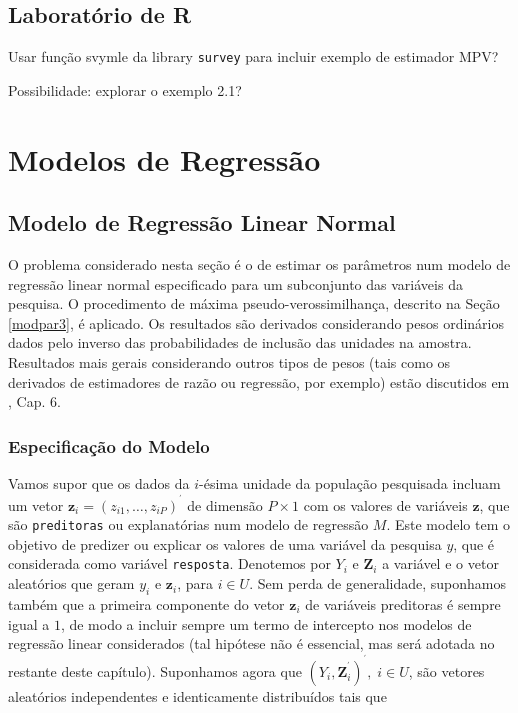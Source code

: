\documentclass[]{book}
\theoremstyle{definition}
\theoremstyle{definition}
\theoremstyle{definition}
\theoremstyle{remark}
\begin{document}
\section{Laboratório de R}\label{laboratorio-de-r-2}

Usar função svymle da library \texttt{survey} \citep{R-survey} para
incluir exemplo de estimador MPV?

Possibilidade: explorar o exemplo 2.1?

\chapter{Modelos de Regressão}\label{modreg}

\section{Modelo de Regressão Linear Normal}\label{modlinear}

O problema considerado nesta seção é o de estimar os parâmetros num
modelo de regressão linear normal especificado para um subconjunto das
variáveis da pesquisa. O procedimento de máxima pseudo-verossimilhança,
descrito na Seção \ref{modpar3}, é aplicado. Os resultados são derivados
considerando pesos ordinários dados pelo inverso das probabilidades de
inclusão das unidades na amostra. Resultados mais gerais considerando
outros tipos de pesos (tais como os derivados de estimadores de razão ou
regressão, por exemplo) estão discutidos em \citep{Silva}, Cap. 6.

\subsection{Especificação do Modelo}\label{especificacao-do-modelo}

Vamos supor que os dados da \(i\)-ésima unidade da população pesquisada
incluam um vetor
\(\mathbf{z}_{i}=\left( z_{i1},\ldots ,z_{iP}\right) ^{^{\prime }}\) de
dimensão \(P\times 1\) com os valores de variáveis \(\mathbf{z}\), que
são \texttt{preditoras} ou explanatórias num modelo de regressão \(M\).
Este modelo tem o objetivo de predizer ou explicar os valores de uma
variável da pesquisa \(y\), que é considerada como variável
\texttt{resposta}. Denotemos por \(Y_{i}\) e \(\mathbf{Z}_{i}\) a
variável e o vetor aleatórios que geram \(y_{i}\) e \(\mathbf{z}_{i}\),
para \(i\in U\). Sem perda de generalidade, suponhamos também que a
primeira componente do vetor \(\mathbf{z}_{i}\) de variáveis preditoras
é sempre igual a \(1\), de modo a incluir sempre um termo de intercepto
nos modelos de regressão linear considerados (tal hipótese não é
essencial, mas será adotada no restante deste capítulo). Suponhamos
agora que
\(\left( Y_{i},\mathbf{Z}_{i}^{^{\prime }}\right) ^{^{\prime }},\;i\in U\),
são vetores aleatórios independentes e identicamente distribuídos tais
que
\end{document}
